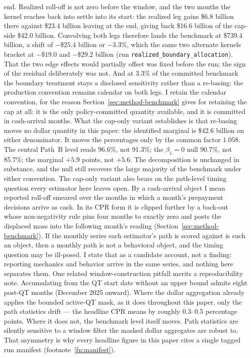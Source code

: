 \documentclass[12pt]{article}
\begin{document}
end. Realized roll-off is not zero before the window, and the two months the kernel reaches back into settle into its start: the realized leg gains \$6.8 billion there against \$23.4 billion leaving at the end, giving back \$16.6 billion of the cap-side \$42.0 billion. Convolving both legs therefore lands the benchmark at \$739.4 billion, a shift of $-\$25.4$ billion or $-3.3$\%, which the same two alternate kernels bracket at $-\$19.0$ and $-\$29.2$ billion (run \texttt{realized\_boundary\_allocation}). That the two edge effects would partially offset was fixed before the run; the sign of the residual deliberately was not. And at 3.3\% of the committed benchmark the boundary treatment stays a disclosed sensitivity rather than a re-basing: the production convention remains calendar on both legs. I retain the calendar convention, for the reason Section~\ref{sec:method-benchmark} gives for retaining the cap at all: it is the only policy-committed quantity available, and it is committed in cash-arrival months. What the cap-only variant establishes is that re-basing moves no dollar quantity in this paper: the identified marginal is \$42.6 billion on either denominator. It moves the percentages only by the common factor $1.058$. The central Path~B level reads 96.6\%, not 91.3\%; the $\beta_1 = 0$ null 90.7\%, not 85.7\%; the marginal $+5.9$ points, not $+5.6$. The decomposition is unchanged in substance, and the null still recovers the large majority of the benchmark under either convention. The cap-only variant also bears on the path-level timing question every estimator here leaves open. By a cash-arrival object I mean reported roll-off smeared over the months in which a month's prepayment decisions arrive as cash. In its CPR form it is clipped further by a back-out whose non-negativity rule pins four months to exactly zero and posts the displaced mass into the following month's reading (Section~\ref{sec:method-benchmark}). If the monthly series each estimator's path is scored against is such an object, then a monthly path is not a behavioral object, and the timing question may be ill-posed. I state that as a candidate account, not a finding: reporting mechanics and behavior arrive in the same series, and nothing here separates them. One related window-construction pitfall merits a reproducibility note. Accumulating from the QT start date without an upper bound admits eight post-QT months (December 2025 onward). Where the dollar aggregation already applies the bounded active-QT mask, as it does throughout this paper, only the path statistics drift --- the headline CPR means by roughly 0.3--0.5 percentage points. Where it does not, the benchmark level itself moves. Path statistics are silently sensitive to a window filter the masked dollar aggregates are robust to. That asymmetry is why every headline figure in this paper cites a single tagged run manifest (footnote~\ref{fn:manifest}).
\end{document}
